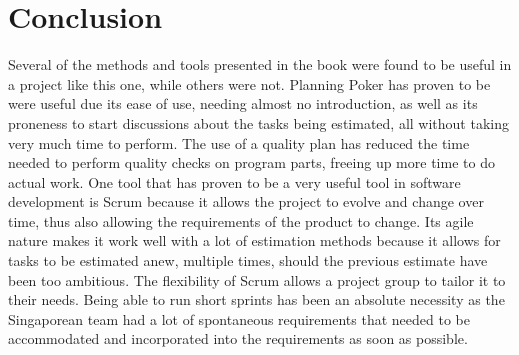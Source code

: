 \section{Conclusion}
Several of the methods and tools presented in the book \cite{caye} were found to be useful in a project like this one, while others were not. 
Planning Poker has proven to be were useful due its ease of use, needing almost no introduction, as well as its proneness to start discussions about the tasks being estimated, all without taking very much time to perform.
The use of a quality plan has reduced the time needed to perform quality checks on program parts, freeing up more time to do actual work.
One tool that has proven to be a very useful tool in software development is Scrum because it allows the project to evolve and change over time, thus also allowing the requirements of the product to change. Its agile nature makes it work well with a lot of estimation methods because it allows for tasks to be estimated anew, multiple times, should the previous estimate have been too ambitious. The flexibility of Scrum allows a project group to tailor it to their needs. Being able to run short sprints has been an absolute necessity as the Singaporean team had a lot of spontaneous requirements that needed to be accommodated and incorporated into the requirements as soon as possible.